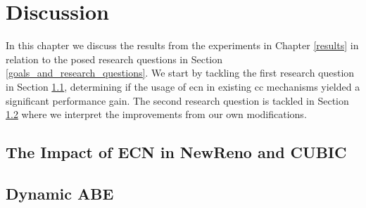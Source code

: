 \chapter{Discussion} \label{discussion}

In this chapter we discuss the results from the experiments in Chapter \ref{results} in relation to the posed research questions in Section \ref{goals_and_research_questions}. We start by tackling the first research question in Section \ref{research_question_1_discussion}, determining if the usage of \gls{ecn} in existing \gls{cc} mechanisms yielded a significant performance gain. The second research question is tackled in Section \ref{research_question_2_discussion} where we interpret the improvements from our own modifications. 




\section{The Impact of ECN in NewReno and CUBIC} \label{research_question_1_discussion}

\todo{}






\section{Dynamic ABE} \label{research_question_2_discussion}

